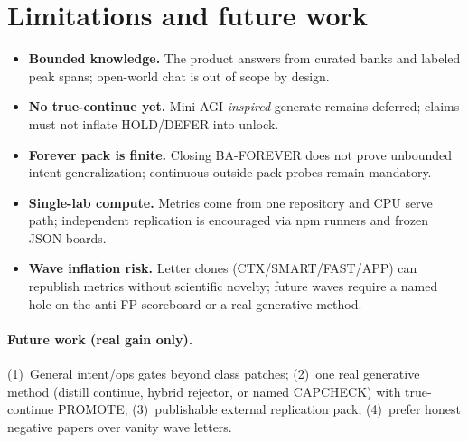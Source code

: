 \section{Limitations and future work}
\label{sec:limitations}

\begin{itemize}
  \item \textbf{Bounded knowledge.} The product answers from curated banks and
        labeled peak spans; open-world chat is out of scope by design.
  \item \textbf{No true-continue yet.} Mini-AGI-\emph{inspired} generate remains
        deferred; claims must not inflate HOLD/DEFER into unlock.
  \item \textbf{Forever pack is finite.} Closing BA-FOREVER does not prove
        unbounded intent generalization; continuous outside-pack probes remain
        mandatory.
  \item \textbf{Single-lab compute.} Metrics come from one repository and CPU
        serve path; independent replication is encouraged via npm runners and
        frozen JSON boards.
  \item \textbf{Wave inflation risk.} Letter clones (CTX/SMART/FAST/APP) can
        republish metrics without scientific novelty; future waves require a
        named hole on the anti-FP scoreboard or a real generative method.
\end{itemize}

\paragraph{Future work (real gain only).}
(1)~General intent/ops gates beyond class patches;
(2)~one real generative method (distill continue, hybrid rejector, or named CAPCHECK)
with true-continue PROMOTE;
(3)~publishable external replication pack;
(4)~prefer honest negative papers over vanity wave letters.
